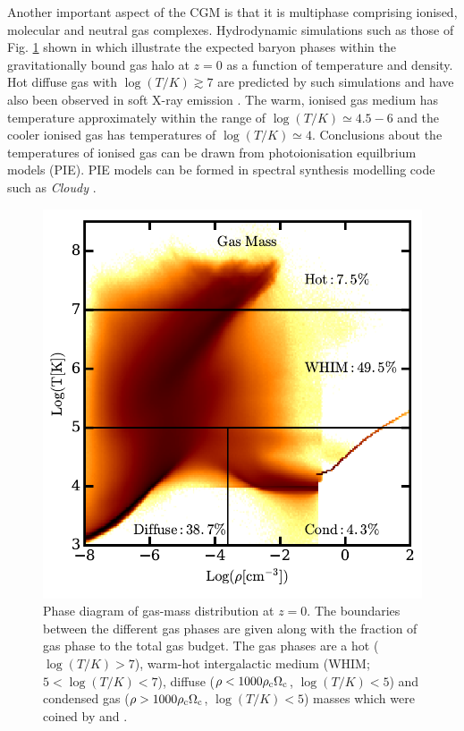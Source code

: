 \documentclass[10pt,a4paper]{article}
\begin{document}
Another important aspect of the CGM is that it is multiphase comprising ionised, molecular and neutral gas complexes. Hydrodynamic simulations such as those of Fig. \ref{fig:phase-diagram-gas-Torrey2019} shown in \citet{Torrey2019} which illustrate the expected baryon phases within the gravitationally bound gas halo at $z=0$ as a function of temperature and density. Hot diffuse gas with $\log{(T/K)} \gtrsim 7$ are predicted by such simulations and have also been observed in soft X-ray emission \citep{AndersonBregman2010}. The warm, ionised gas medium has temperature approximately within the range of $\log{(T/K)} \simeq 4.5 - 6$ and the cooler ionised gas has temperatures of $\log{(T/K)} \simeq 4.$ Conclusions about the temperatures of ionised gas can be drawn from photoionisation equilbrium models (PIE). PIE models can be formed in spectral synthesis modelling code such as {\it Cloudy} \citep{Ferland2013}. 

\begin{figure}
 \centering
 \includegraphics[width=0.7\columnwidth]{plots_chp1/Phase_diag_Torrey2019}
 \caption[Phase diagram of simulated gas-mass distribution at $z=0$]{Phase diagram of gas-mass distribution at $z=0.$ The boundaries between the different gas phases are given along with the fraction of gas phase to the total gas budget. The gas phases are a hot ($\log{(T/K)} > 7$), warm-hot intergalactic medium (WHIM; $5 < \log{(T/K)} < 7$), diffuse ($\rho < 1000\rho_{\rm c}\Omega_{\rm c}$, $\log{(T/K)} < 5$) and condensed gas ($\rho > 1000\rho_{\rm c}\Omega_{\rm c}$, $\log{(T/K)} < 5$) masses which were coined by \citet{Dave2001} and \citet{Haider2016}.}
 \label{fig:phase-diagram-gas-Torrey2019}
\end{figure}
\end{document}
